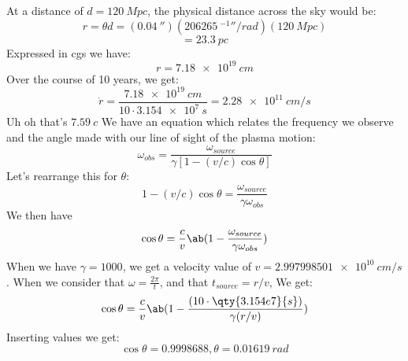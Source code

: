 

At a distance of $d = \qty{120}{Mpc}$, the physical distance across the sky would be:
\begin{equation}
    r = \theta d = (\qty{0.04}{''})(\qty{206265}{^{-1}''/rad})(\qty{120}{Mpc})
\end{equation}
\begin{equation}
    = \qty{23.3}{pc}
\end{equation}
Expressed in cgs we have:
\begin{equation}
    r = \qty{7.18e19}{cm}
\end{equation}
Over the course of 10 years, we get:
\begin{equation}
    \dot{r} = \frac{\qty{7.18e19}{cm}}{10\cdot\qty{3.154e7}{s}} = \qty{2.28e11}{cm/s}
\end{equation}
Uh oh that's $\qty{7.59}{c}$
We have an equation which relates the frequency we observe and the angle made with our line of sight of the plasma motion:
\begin{equation}
    \omega_{obs} = \frac{\omega_{source}}{\gamma[1-(v/c)\cos\theta]}
\end{equation}
Let's rearrange this for $\theta$:
\begin{equation}
    1 -(v/c)\cos\theta = \frac{\omega_{source}}{\gamma\omega_{obs}}
\end{equation}
We then have 
\begin{equation}
    \cos\theta = \frac{c}{v}\ab(1 - \frac{\omega_{source}}{\gamma\omega_{obs}})
\end{equation}
When we have $\gamma = 1000$, we get a velocity value of $v = \qty{2.997998501e10}{cm/s}$. When we consider that $\omega = \frac{2\pi}{t}$, and that $t_{source} = r/v$, We get:
\begin{equation}
    \cos\theta = \frac{c}{v}\ab(1 - \frac{(10\cdot\qty{3.154e7}{s})}{\gamma(r/v)})
\end{equation}
Inserting values we get:
\begin{equation}
    \cos\theta = 0.9998688, \theta = \qty{0.01619}{rad}
\end{equation}